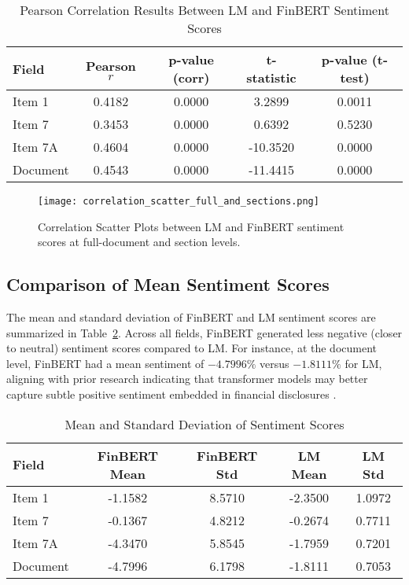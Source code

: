 \documentclass[12pt]{article}
\begin{document}
\begin{table}[H]
\centering
\caption{Pearson Correlation Results Between LM and FinBERT Sentiment Scores}
\label{tab:correlation_results}
\begin{tabular}{lcccc}
\hline
Field & Pearson $r$ & p-value (corr) & t-statistic & p-value (t-test) \\
\hline
Item 1 & 0.4182 & 0.0000 & 3.2899 & 0.0011 \\
Item 7 & 0.3453 & 0.0000 & 0.6392 & 0.5230 \\
Item 7A & 0.4604 & 0.0000 & -10.3520 & 0.0000 \\
Document & 0.4543 & 0.0000 & -11.4415 & 0.0000 \\
\hline
\end{tabular}
\end{table}

\begin{figure}[H]
\centering
\texttt{[image: correlation\_scatter\_full\_and\_sections.png]}
\caption{Correlation Scatter Plots between LM and FinBERT sentiment scores at full-document and section levels.}
\label{fig:scatter_all}
\end{figure}
\vspace{0.5cm}

\subsection{Comparison of Mean Sentiment Scores}

The mean and standard deviation of FinBERT and LM sentiment scores are summarized in Table~\ref{tab:mean_std_results}. Across all fields, FinBERT generated less negative (closer to neutral) sentiment scores compared to LM. For instance, at the document level, FinBERT had a mean sentiment of $-4.7996\%$ versus $-1.8111\%$ for LM, aligning with prior research indicating that transformer models may better capture subtle positive sentiment embedded in financial disclosures \citep{Huang2020}.

\begin{table}[H]
\centering
\caption{Mean and Standard Deviation of Sentiment Scores}
\label{tab:mean_std_results}
\begin{tabular}{lcccc}
\hline
Field & FinBERT Mean & FinBERT Std & LM Mean & LM Std \\
\hline
Item 1 & -1.1582 & 8.5710 & -2.3500 & 1.0972 \\
Item 7 & -0.1367 & 4.8212 & -0.2674 & 0.7711 \\
Item 7A & -4.3470 & 5.8545 & -1.7959 & 0.7201 \\
Document & -4.7996 & 6.1798 & -1.8111 & 0.7053 \\
\hline
\end{tabular}
\end{table}
\vspace{0.5cm}
\end{document}
